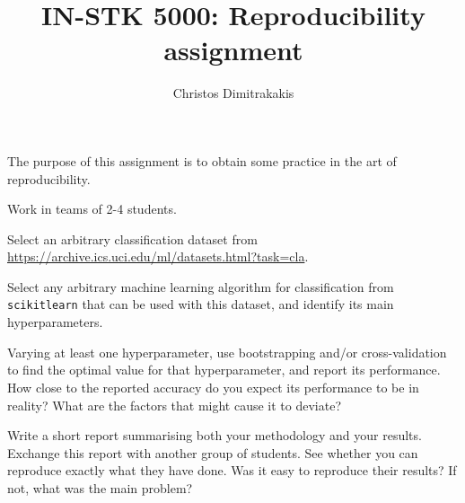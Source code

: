 \documentclass[a4paper]{article}
\title{IN-STK 5000: Reproducibility assignment}
\author{Christos Dimitrakakis}
\begin{document}
\maketitle
The purpose of this assignment is to obtain some practice in the art of reproducibility.

\begin{exercise}
  Work in teams of 2-4 students.

  Select an arbitrary classification dataset from \url{https://archive.ics.uci.edu/ml/datasets.html?task=cla}. 

  Select any arbitrary machine learning algorithm for classification
  from \texttt{scikitlearn} that can be used with this dataset, and identify its main hyperparameters.
    
  Varying at least one hyperparameter, use bootstrapping and/or
  cross-validation to find the optimal value for that hyperparameter,
  and report its performance. How close to the reported accuracy do
  you expect its performance to be in reality?  What are the factors
  that might cause it to deviate?
  
  Write a short report summarising both your methodology and your
  results. Exchange this report with another group of students. See
  whether you can reproduce exactly what they have done. Was it easy
  to reproduce their results? If not, what was the main problem?
\end{exercise}
\end{document}
